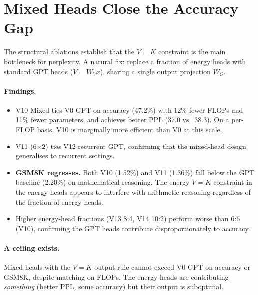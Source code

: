 \section{Mixed Heads Close the Accuracy Gap}
\label{sec:mixed}

The structural ablations establish that the $V{=}K$ constraint is the main bottleneck
for perplexity.  A natural fix: replace a fraction of energy heads with standard
GPT heads ($V = W_V x$), sharing a single output projection $W_O$.

\begin{table}[h]
\centering
\caption{Iso-family comparison.  All trained 30k steps.  FLOPs = forward pass, $s=4096$.
  V10/V11 use the mixed-head (additive) block.  V12 is a recurrent GPT baseline.}
\label{tab:mixed_results}
\resizebox{\textwidth}{!}{%
}
\end{table}

\paragraph{Findings.}
\begin{itemize}
  \item V10 Mixed ties V0 GPT on accuracy (47.2\%) with 12\% fewer FLOPs and 11\% fewer
    parameters, and achieves better PPL (37.0 vs.\ 38.3).
    On a per-FLOP basis, V10 is marginally more efficient than V0 at this scale.
  \item V11 (6$\times$2) ties V12 recurrent GPT,
    confirming that the mixed-head design generalises to recurrent settings.
  \item \textbf{GSM8K regresses.}  Both V10 (1.52\%) and V11 (1.36\%) fall below
    the GPT baseline (2.20\%) on mathematical reasoning.
    The energy $V{=}K$ constraint in the energy heads appears to interfere with
    arithmetic reasoning regardless of the fraction of energy heads.
  \item Higher energy-head fractions (V13 8:4, V14 10:2) perform worse than 6:6 (V10),
    confirming the GPT heads contribute disproportionately to accuracy.
\end{itemize}

\paragraph{A ceiling exists.}
Mixed heads with the $V{=}K$ output rule cannot exceed V0 GPT on accuracy or GSM8K,
despite matching on FLOPs.  The energy heads are contributing \emph{something}
(better PPL, some accuracy) but their output is suboptimal.


